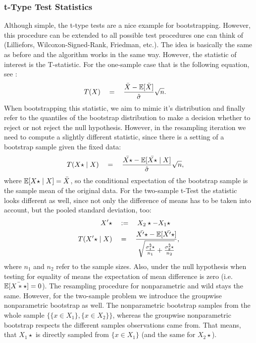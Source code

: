	\subsubsection*{t-Type Test Statistics}
Although simple, the t-type tests are a nice example for bootstrapping. However, this procedure can be extended to all possible test procedures one can think of (Lilliefors, Wilcoxon-Signed-Rank, Friedman, etc.). The idea is basically the same as before and the algorithm works in the same way. However, the statistic of interest is the T-statistic. For the one-sample case that is the following equation, see \citet{t}:
\begin{align*}
	T(X) \quad &= \quad \frac{\bar{X} - \mathbb{E}[\bar{X}]}{\hat{\sigma}}\sqrt{n}.
\end{align*}
When bootstrapping this statistic, we aim to mimic it's distribution and finally refer to the quantiles of the bootstrap distribution to make a decision whether to reject or not reject the null hypothesis. However, in the resampling iteration we need to compute a slightly different statistic, since there is a setting of a bootstrap sample given the fixed data:
\begin{align*}
	T(X\star \mid X) \quad &= \quad \frac{\bar{X\star} - \mathbb{E}[\bar{X\star} \mid X]}{\hat{\sigma}}\sqrt{n},
\end{align*}
where $\mathbb{E}[X\star \mid X] = \bar{X}$, so the conditional expectation of the bootstrap sample is the sample mean of the original data. For the two-sample t-Test the statistic looks different as well, since not only the difference of means has to be taken into account, but the pooled standard deviation, too:
\begin{align*}
	X'\star \quad &:= \quad X_2\star - X_1\star \\
	T(X'\star \mid X) \quad &= \quad \frac{\bar{X'\star} - \mathbb{E}[\bar{X'\star}]}{\sqrt{\frac{\hat{\sigma_1^2\star}}{n_1} + \frac{\hat{\sigma_2^2\star}}{n_2}}},
\end{align*}
where $n_1$ and $n_2$ refer to the sample sizes. Also, under the null hypothesis when testing for equality of means the expectation of mean difference is zero (i.e. $\mathbb{E}[\bar{X*\star}] = 0$). The resampling procedure for nonparametric and wild stays the same. However, for the two-sample problem we introduce the groupwise nonparametric bootstrap as well. The nonparametric bootstrap samples from the whole sample $\{\{x \in X_1\}, \{x \in X_2\}\}$, whereas the groupwise nonparametric bootstrap respects the different samples observations came from. That means, that $X_1\star$ is directly sampled from $\{x \in X_1\}$ (and the same for $X_2\star$).

